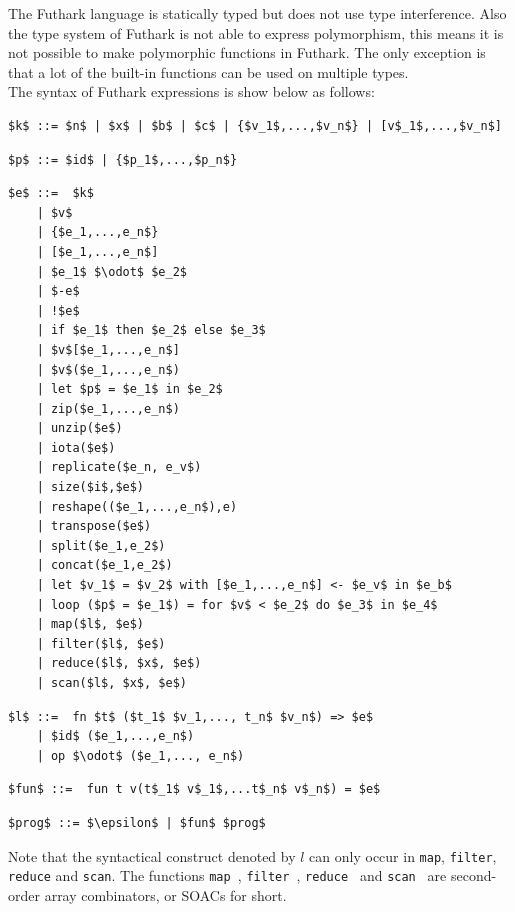 \documentclass[11pt]{article}
\begin{document}
The Futhark language is statically typed but does not use type interference. Also the type system of Futhark is not 
able to express polymorphism, this means it is not possible to make polymorphic functions in Futhark.
The only exception is that a lot of the built-in functions can be used on multiple types.\\

The syntax of Futhark expressions is show below as follows:
\begin{lstlisting}[numbers=none,frame=none]
$k$ ::= $n$ | $x$ | $b$ | $c$ | {$v_1$,...,$v_n$} | [v$_1$,...,$v_n$] 
\end{lstlisting}
\begin{lstlisting}[numbers=none,frame=none]
$p$ ::= $id$ | {$p_1$,...,$p_n$}
\end{lstlisting}

\begin{lstlisting}[numbers=none,frame=none]
$e$ ::=  $k$
    | $v$ 
    | {$e_1,...,e_n$} 
    | [$e_1,...,e_n$] 
    | $e_1$ $\odot$ $e_2$ 
    | $-e$ 
    | !$e$ 
    | if $e_1$ then $e_2$ else $e_3$ 
    | $v$[$e_1,...,e_n$] 
    | $v$($e_1,...,e_n$) 
    | let $p$ = $e_1$ in $e_2$
    | zip($e_1,...,e_n$) 
    | unzip($e$)
    | iota($e$) 
    | replicate($e_n, e_v$) 
    | size($i$,$e$) 
    | reshape(($e_1,...,e_n$),e)
    | transpose($e$)
    | split($e_1,e_2$)
    | concat($e_1,e_2$)
    | let $v_1$ = $v_2$ with [$e_1,...,e_n$] <- $e_v$ in $e_b$
    | loop ($p$ = $e_1$) = for $v$ < $e_2$ do $e_3$ in $e_4$
    | map($l$, $e$)
    | filter($l$, $e$)
    | reduce($l$, $x$, $e$)
    | scan($l$, $x$, $e$)
\end{lstlisting}

\begin{lstlisting}[numbers=none,frame=none]
$l$ ::=  fn $t$ ($t_1$ $v_1,..., t_n$ $v_n$) => $e$
    | $id$ ($e_1,...,e_n$)
    | op $\odot$ ($e_1,..., e_n$)
\end{lstlisting}

\begin{lstlisting}[numbers=none,frame=none]
$fun$ ::=  fun t v(t$_1$ v$_1$,...t$_n$ v$_n$) = $e$
\end{lstlisting}

\begin{lstlisting}[numbers=none,frame=none]
$prog$ ::= $\epsilon$ | $fun$ $prog$
\end{lstlisting}

Note that the syntactical construct denoted by $l$ can only occur in {\tt map}, {\tt filter}, {\tt reduce} and {\tt scan}.
The functions {\tt map }, {\tt filter }, {\tt reduce } and {\tt scan } are second-order array combinators, or SOACs for short.
\end{document}
